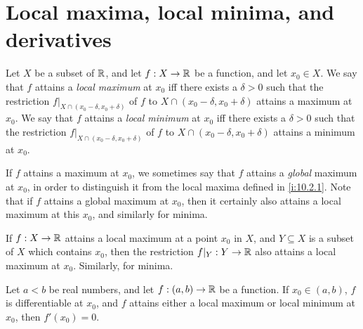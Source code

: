 \section{Local maxima, local minima, and derivatives}\label{i:sec:10.2}

\begin{defn}\label{i:10.2.1}
  Let \(X\) be a subset of \(\mathbb{R}\), and let \(f : X \to \mathbb{R}\) be a function, and let \(x_0 \in X\).
  We say that \(f\) attains a \emph{local maximum} at \(x_0\) iff there exists a \(\delta > 0\) such that the restriction \(f|_{X \cap (x_0 - \delta, x_0 + \delta)}\) of \(f\) to \(X \cap (x_0 - \delta, x_0 + \delta)\) attains a maximum at \(x_0\).
  We say that \(f\) attains a \emph{local minimum} at \(x_0\) iff there exists a \(\delta > 0\) such that the restriction \(f|_{X \cap (x_0 - \delta, x_0 + \delta)}\) of \(f\) to \(X \cap (x_0 - \delta, x_0 + \delta)\) attains a minimum at \(x_0\).
\end{defn}

\begin{rmk}\label{i:10.2.2}
  If \(f\) attains a maximum at \(x_0\), we sometimes say that \(f\) attains a \emph{global} maximum at \(x_0\), in order to distinguish it from the local maxima defined in \cref{i:10.2.1}.
  Note that if \(f\) attains a global maximum at \(x_0\), then it certainly also attains a local maximum at this \(x_0\), and similarly for minima.
\end{rmk}

\setcounter{thm}{4}
\begin{rmk}\label{i:10.2.5}
  If \(f : X \to \mathbb{R}\) attains a local maximum at a point \(x_0\) in \(X\), and \(Y \subseteq X\) is a subset of \(X\) which contains \(x_0\), then the restriction \(f|_Y : Y \to \mathbb{R}\) also attains a local maximum at \(x_0\).
  Similarly, for minima.
\end{rmk}

\begin{prop}\label{i:10.2.6}
  Let \(a < b\) be real numbers, and let \(f : (a, b) \to \mathbb{R}\) be a function.
  If \(x_0 \in (a, b)\), \(f\) is differentiable at \(x_0\), and \(f\) attains either a local maximum or local minimum at \(x_0\), then \(f'(x_0) = 0\).
\end{prop}

